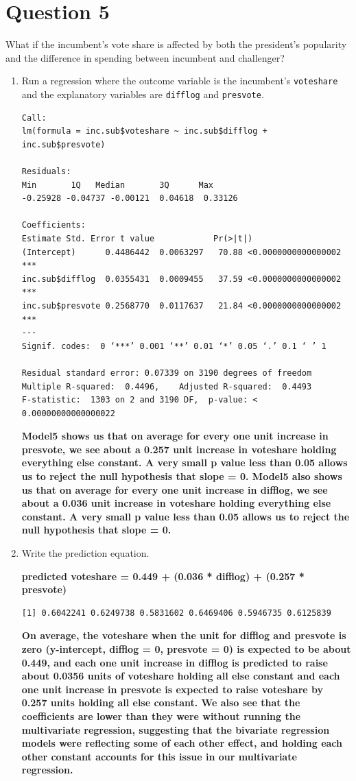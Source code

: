 \documentclass[12pt,letterpaper]{article}
\begin{document}
\section*{Question 5}
\noindent What if the incumbent's vote share is affected by both the president's popularity and the difference in spending between incumbent and challenger? 
	\begin{enumerate}
		\item Run a regression where the outcome variable is the incumbent's \texttt{voteshare} and the explanatory variables are \texttt{difflog} and \texttt{presvote}.	
		

\begin{verbatim}
Call:
lm(formula = inc.sub$voteshare ~ inc.sub$difflog + inc.sub$presvote)

Residuals:
Min       1Q   Median       3Q      Max 
-0.25928 -0.04737 -0.00121  0.04618  0.33126 

Coefficients:
Estimate Std. Error t value            Pr(>|t|)    
(Intercept)      0.4486442  0.0063297   70.88 <0.0000000000000002 ***
inc.sub$difflog  0.0355431  0.0009455   37.59 <0.0000000000000002 ***
inc.sub$presvote 0.2568770  0.0117637   21.84 <0.0000000000000002 ***
---
Signif. codes:  0 ‘***’ 0.001 ‘**’ 0.01 ‘*’ 0.05 ‘.’ 0.1 ‘ ’ 1

Residual standard error: 0.07339 on 3190 degrees of freedom
Multiple R-squared:  0.4496,	Adjusted R-squared:  0.4493 
F-statistic:  1303 on 2 and 3190 DF,  p-value: < 0.00000000000000022 
\end{verbatim}
\textbf{Model5 shows us that on average for every one unit increase in presvote, we see about a 0.257 unit increase in voteshare holding everything else constant. A very small p value less than 0.05 allows us to reject the null hypothesis that slope = 0. Model5 also shows us that on average for every one unit increase in difflog, we see about a 0.036 unit increase in voteshare holding everything else constant. A very small p value less than 0.05 allows us to reject the null hypothesis that slope = 0.}
		
		\item Write the prediction equation.

\textbf{predicted voteshare = 0.449 + (0.036 * difflog) + (0.257 * presvote)}

\begin{verbatim}
[1] 0.6042241 0.6249738 0.5831602 0.6469406 0.5946735 0.6125839
\end{verbatim}
\textbf{On average, the voteshare when the unit for difflog and presvote is zero (y-intercept, difflog = 0, presvote = 0) is expected to be about 0.449, and each one unit increase in difflog is predicted to raise about 0.0356 units of voteshare holding all else constant and each one unit increase in presvote is expected to raise voteshare by 0.257 units holding all else constant. We also see that the coefficients are lower than they were without running the multivariate regression, suggesting that the bivariate regression models were reflecting some of each other effect, and holding each other constant accounts for this issue in our multivariate regression. }


\end{enumerate}
\end{document}
